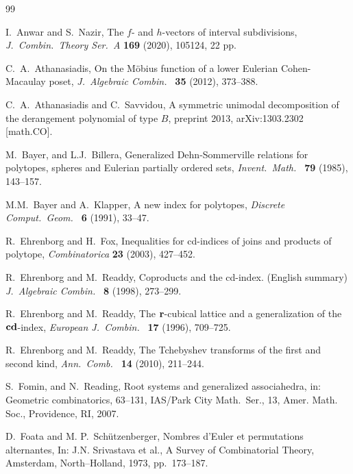 \documentclass[reqno,12pt]{amsart}
\numberwithin{equation}{section}
\newcommand{\0}{\widehat{0}}
\newcommand{\1}{\widehat{1}}
\newcommand{\2}{\widehat{2}}
\begin{document}
\begin{thebibliography}{99}

I.\ Anwar and S.\ Nazir, 
The $f$- and $h$-vectors of interval subdivisions,
{\it J.\ Combin.\ Theory Ser.\ A } {\bf 169} (2020), 105124, 22 pp.   
  
C.\ A.\ Athanasiadis, 
On the M\"obius function of a lower Eulerian Cohen-Macaulay poset,
{\it J.\ Algebraic Combin.\ } {\bf 35} (2012), 373--388. 

  C.\ A.\ Athanasiadis and C.\ Savvidou,
A symmetric unimodal decomposition of the derangement polynomial of type
$B$, preprint 2013, arXiv:1303.2302 [math.CO].


  
M.\ Bayer, and L.J.\ Billera, 
Generalized Dehn-Sommerville relations for polytopes, spheres and
Eulerian partially ordered sets, 
{\it Invent.\ Math.\ } {\bf 79} (1985), 143--157. 

  
M.M.\ Bayer and A.\ Klapper, 
A new index for polytopes,
{\it Discrete Comput.\ Geom.\ } {\bf 6} (1991), 33--47.   
  
  R.\ Ehrenborg and H.\ Fox,
Inequalities for cd-indices of joins and products of polytope, 
{\it Combinatorica} {\bf 23} (2003), 427--452.   

  R.\ Ehrenborg and M.\ Readdy,
Coproducts and the cd-index. (English summary)
{\it J.\ Algebraic Combin.\ } {\bf 8} (1998), 273--299. 

 R.\ Ehrenborg and M.\ Readdy,
The ${\bf r}$-cubical lattice and a generalization of the
${\bf cd}$-index, 
{\it European J.\ Combin.\ } {\bf 17} (1996), 709--725. 

 
  R.\ Ehrenborg and M.\ Readdy,
The Tchebyshev transforms of the first and second kind,
{\it Ann.\ Comb.\ } {\bf 14} (2010), 211--244.   

S.\ Fomin, and N.\ Reading, 
Root systems and generalized associahedra, in: Geometric combinatorics, 63--131,
IAS/Park City Math.\ Ser., 13, Amer. Math. Soc., Providence, RI, 2007.   

 D.\ Foata and M. P.\ Sch\"{u}tzenberger,
  Nombres d'Euler et permutations alternantes,
In: J.N. Srivastava et al.,
A Survey of Combinatorial Theory, Amsterdam, North--Holland,
1973, pp.\ 173--187.


\end{thebibliography}
\end{document}

